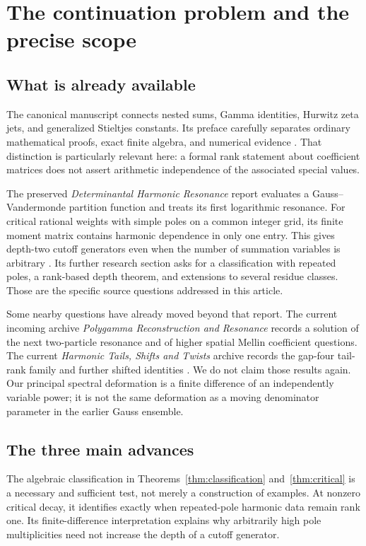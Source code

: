 \documentclass[11pt,letterpaper]{article}
\numberwithin{equation}{section}
\theoremstyle{definition}\newtheorem{definition}[theorem]{Definition}
\theoremstyle{remark}\newtheorem{remark}[theorem]{Remark}
\begin{document}
\hypersetup{pageanchor=true}
\begingroup\small\setlength{\parskip}{0pt}\tableofcontents\endgroup
\clearpage
{}
\section{The continuation problem and the precise scope}
\label{sec:context}

\subsection{What is already available}
The canonical manuscript connects nested sums, Gamma identities, Hurwitz
zeta jets, and generalized Stieltjes constants. Its preface carefully
separates ordinary mathematical proofs, exact finite algebra, and numerical
evidence \cite{repo:main}. That distinction is particularly relevant here:
a formal rank statement about coefficient matrices does not assert
arithmetic independence of the associated special values.

The preserved \emph{Determinantal Harmonic Resonance} report evaluates a
Gauss--Vandermonde partition function and treats its first logarithmic
resonance. For critical rational weights with simple poles on a common
integer grid, its finite moment matrix contains harmonic dependence in
only one entry. This gives depth-two cutoff generators even when the
number of summation variables is arbitrary \cite{repo:dhr}. Its further
research section asks for a classification with repeated poles, a rank-based
depth theorem, and extensions to several residue classes. Those are the
specific source questions addressed in this article.

Some nearby questions have already moved beyond that report. The current
incoming archive \emph{Polygamma Reconstruction and Resonance} records a
solution of the next two-particle resonance and of higher spatial Mellin
coefficient questions. The current \emph{Harmonic Tails, Shifts and Twists}
archive records the gap-four tail-rank family and further shifted identities
\cite{repo:incoming}. We do not claim those results again. Our principal
spectral deformation is a finite difference of an independently variable
power; it is not the same deformation as a moving denominator parameter
in the earlier Gauss ensemble.

\subsection{The three main advances}
The algebraic classification in Theorems~\ref{thm:classification}
and~\ref{thm:critical} is a necessary and sufficient test, not merely a
construction of examples. At nonzero critical decay, it identifies exactly
when repeated-pole harmonic data remain rank one. Its finite-difference
interpretation explains why arbitrarily high pole multiplicities need not
increase the depth of a cutoff generator.
\end{document}
